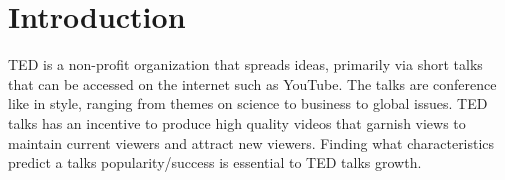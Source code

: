 \section{Introduction}
TED is a non-profit organization that spreads ideas, primarily via short talks that can be accessed on the internet such as YouTube.
The talks are conference like in style, ranging from themes on science to business to global issues.
TED talks has an incentive to produce high quality videos that garnish views to maintain current viewers and attract new viewers.
Finding what characteristics predict a talks popularity/success is essential to TED talks growth.
